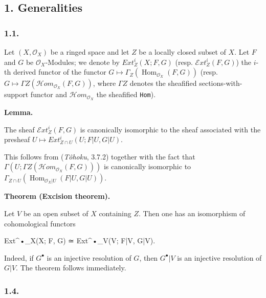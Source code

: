 \documentclass[
]{article}
\newenvironment{Shaded}{}{}
\newcommand{\NormalTok}[1]{#1}
\begin{document}
\subsection{1. Generalities}\label{generalities}

\subsubsection{1.1.}\label{section}

Let \((X, \mathcal{O}_{X})\) be a ringed space and let \(Z\) be a
locally closed subset of \(X\). Let \(F\) and \(G\) be
\(\mathcal{O}_{X}\)-Modules; we denote by \(Ext^{i}_{Z}(X; F, G)\)
(resp. \(\mathcal{E}xt^{i}_{Z}(F, G)\)) the \(i\)-th derived functor of
the functor
\(G \mapsto \Gamma_{Z}(\operatorname{Hom}_{\mathcal{O}_{X}}(F, G))\)
(resp. \(G \mapsto \Gamma Z(\mathcal{H}om_{\mathcal{O}_{X}}(F, G))\),
where \(\Gamma Z\) denotes the sheafified sections-with-support functor
and \(\mathcal{H}om_{\mathcal{O}_{X}}\) the sheafified \texttt{Hom}).

\textbf{Lemma.}

The sheaf \(\mathcal{E}xt^{i}_{Z}(F, G)\) is canonically isomorphic to
the sheaf associated with the presheaf
\(U \mapsto Ext^{i}_{Z \cap U}(U; F|U, G|U)\).

This follows from (\emph{Tôhoku}, 3.7.2) together with the fact that
\(\Gamma(U; \Gamma Z(\mathcal{H}om_{\mathcal{O}_{X}}(F, G)))\) is
canonically isomorphic to
\(\Gamma_{Z \cap U}(\operatorname{Hom}_{\mathcal{O}_{X}|U}(F|U, G|U))\).

\textbf{Theorem (Excision theorem).}

Let \(V\) be an open subset of \(X\) containing \(Z\). Then one has an
isomorphism of cohomological functors

\begin{Shaded}
\begin{Highlighting}[]
\NormalTok{Ext\^{}•\_X(X; F, G) ≃ Ext\^{}•\_V(V; F|V, G|V).}
\end{Highlighting}
\end{Shaded}

Indeed, if \(G^{\bullet}\) is an injective resolution of \(G\), then
\(G^{\bullet}|V\) is an injective resolution of \(G|V\). The theorem
follows immediately.

\subsubsection{1.4.}\label{section-1}
\end{document}
